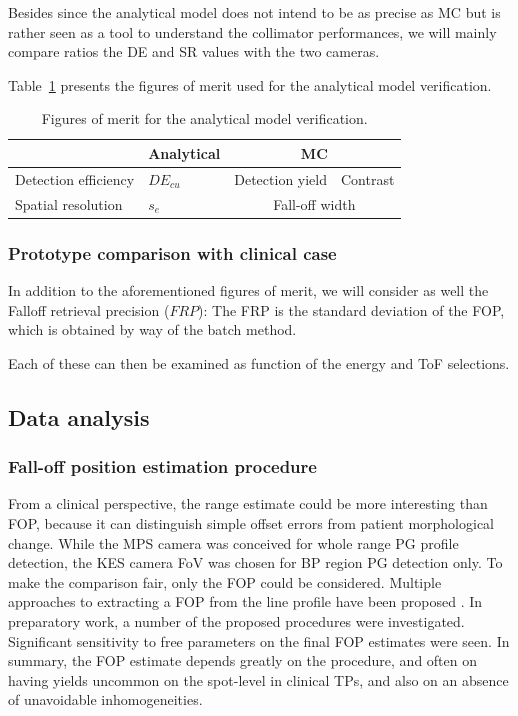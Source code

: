 \documentclass[a4paper,english]{article}
\begin{document}
Besides since the analytical model does not intend to be as precise as MC but is rather seen as a tool to understand the collimator performances, we will mainly compare ratios the DE and SR values with the two cameras.

Table~\ref{table:FOM} presents the figures of merit used for the analytical model verification.

\begin{table}
\centering
\begin{tabular}{|l|l|c|c|}
	\hline
						& Analytical & \multicolumn{2}{c|}{ MC}\\
	\hline
	Detection efficiency	& $DE_{cu}$	& Detection yield & Contrast \\
	\hline
	Spatial resolution & $s_e$								& \multicolumn{2}{c|}{Fall-off width}\\
	\hline	
\end{tabular}
\caption{Figures of merit for the analytical model verification.}
\label{table:FOM}
\end{table}


\subsubsection{Prototype comparison with clinical case}

In addition to the aforementioned figures of merit, we will consider as well the Falloff retrieval precision ($FRP$): The FRP is the standard deviation of the FOP, which is obtained by way of the batch method.

Each of these can then be examined as function of the energy and ToF selections.


\subsection{Data analysis}

\subsubsection{Fall-off position estimation procedure}

From a clinical perspective, the range estimate could be more interesting than FOP, because it can distinguish simple offset errors from patient morphological change. While the MPS camera was conceived for whole range PG profile detection, the KES camera FoV was chosen for BP region PG detection only. To make the comparison fair, only the FOP could be considered. Multiple approaches to extracting a FOP from the line profile have been proposed \citep{Smeets2012,Gueth2013,Roellinghoff2014a,Janssen2014,Sterpin2015}. In preparatory work, a number of the proposed procedures were investigated. Significant sensitivity to free parameters on the final FOP estimates were seen. In summary, the FOP estimate depends greatly on the procedure, and often on having yields uncommon on the spot-level in clinical TPs, and also on an absence of unavoidable inhomogeneities.
\end{document}
